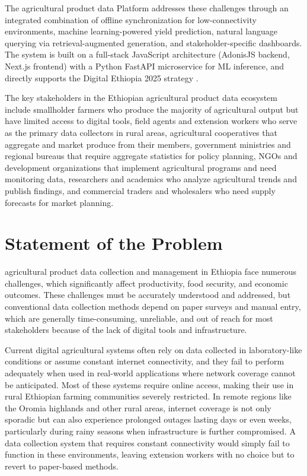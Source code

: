 \documentclass[12pt,a4paper,oneside]{report}
\begin{document}
The agricultural product data Platform addresses these challenges through an integrated combination of offline synchronization for low-connectivity environments, machine learning-powered yield prediction, natural language querying via retrieval-augmented generation, and stakeholder-specific dashboards. The system is built on a full-stack JavaScript architecture (AdonisJS backend, Next.js frontend) with a Python FastAPI microservice for ML inference, and directly supports the Digital Ethiopia 2025 strategy \cite{digitalethiopia2025}.

The key stakeholders in the Ethiopian agricultural product data ecosystem include smallholder farmers who produce the majority of agricultural output but have limited access to digital tools, field agents and extension workers who serve as the primary data collectors in rural areas, agricultural cooperatives that aggregate and market produce from their members, government ministries and regional bureaus that require aggregate statistics for policy planning, NGOs and development organizations that implement agricultural programs and need monitoring data, researchers and academics who analyze agricultural trends and publish findings, and commercial traders and wholesalers who need supply forecasts for market planning.



\section{Statement of the Problem}
agricultural product data collection and management in Ethiopia face numerous challenges, which significantly affect productivity, food security, and economic outcomes. These challenges must be accurately understood and addressed, but conventional data collection methods depend on paper surveys and manual entry, which are generally time-consuming, unreliable, and out of reach for most stakeholders because of the lack of digital tools and infrastructure.

Current digital agricultural systems often rely on data collected in laboratory-like conditions or assume constant internet connectivity, and they fail to perform adequately when used in real-world applications where network coverage cannot be anticipated. Most of these systems require online access, making their use in rural Ethiopian farming communities severely restricted. In remote regions like the Oromia highlands and other rural areas, internet coverage is not only sporadic but can also experience prolonged outages lasting days or even weeks, particularly during rainy seasons when infrastructure is further compromised. A data collection system that requires constant connectivity would simply fail to function in these environments, leaving extension workers with no choice but to revert to paper-based methods.
\end{document}
